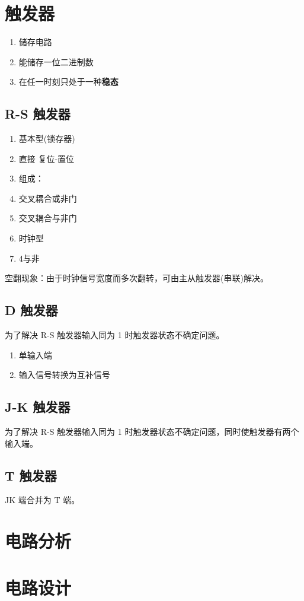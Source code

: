 \newpage

\section{触发器}

\begin{enumerate}
    \item 储存电路
    \item 能储存一位二进制数
    \item 在任一时刻只处于一种\textbf{稳态}
\end{enumerate}

\subsection{R-S 触发器}

\begin{enumerate}
    \item 基本型(锁存器)
    \item 直接 复位-置位
    \item 组成：
    \item 交叉耦合或非门
    \item 交叉耦合与非门
    \item 时钟型
    \item 4\*与非
\end{enumerate}

空翻现象：由于时钟信号宽度而多次翻转，可由主从触发器(串联)解决。

\newpage

\subsection{D 触发器}

为了解决 R-S 触发器输入同为 1 时触发器状态不确定问题。

\begin{enumerate}
    \item 单输入端
    \item 输入信号转换为互补信号
\end{enumerate}

\subsection{J-K 触发器}

为了解决 R-S 触发器输入同为 1 时触发器状态不确定问题，同时使触发器有两个输入端。

\subsection{T 触发器}

JK 端合并为 T 端。

\newpage

\section{电路分析}

\section{电路设计}

\newpage
